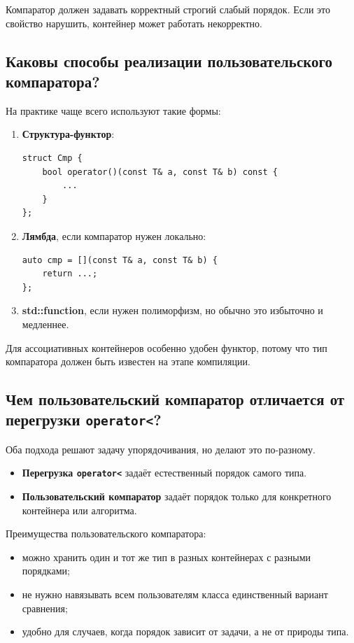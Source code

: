 \begin{remark}
Компаратор должен задавать корректный строгий слабый порядок. Если это свойство нарушить, контейнер может работать некорректно.
\end{remark}

\subsection{Каковы способы реализации пользовательского компаратора?}
На практике чаще всего используют такие формы:
\begin{enumerate}
    \item \textbf{Структура-функтор}:
\begin{verbatim}
struct Cmp {
    bool operator()(const T& a, const T& b) const {
        ...
    }
};
\end{verbatim}

    \item \textbf{Лямбда}, если компаратор нужен локально:
\begin{verbatim}
auto cmp = [](const T& a, const T& b) {
    return ...;
};
\end{verbatim}

    \item \textbf{std::function}, если нужен полиморфизм, но обычно это избыточно и медленнее.
\end{enumerate}

Для ассоциативных контейнеров особенно удобен функтор, потому что тип компаратора должен быть известен на этапе компиляции.

\subsection{Чем пользовательский компаратор отличается от перегрузки \texttt{operator<}?}
Оба подхода решают задачу упорядочивания, но делают это по-разному.

\begin{itemize}
    \item \textbf{Перегрузка \texttt{operator<}} задаёт естественный порядок самого типа.
    \item \textbf{Пользовательский компаратор} задаёт порядок только для конкретного контейнера или алгоритма.
\end{itemize}

Преимущества пользовательского компаратора:
\begin{itemize}
    \item можно хранить один и тот же тип в разных контейнерах с разными порядками;
    \item не нужно навязывать всем пользователям класса единственный вариант сравнения;
    \item удобно для случаев, когда порядок зависит от задачи, а не от природы типа.
\end{itemize}

